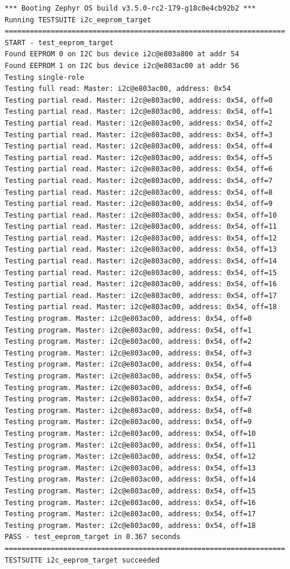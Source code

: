 \documentclass[11pt,a4paper,oneside]{article}
\begin{document}
\begin{lstlisting}
*** Booting Zephyr OS build v3.5.0-rc2-179-g18c0e4cb92b2 ***
Running TESTSUITE i2c_eeprom_target
===================================================================
START - test_eeprom_target
Found EEPROM 0 on I2C bus device i2c@e803a800 at addr 54
Found EEPROM 1 on I2C bus device i2c@e803ac00 at addr 56
Testing single-role
Testing full read: Master: i2c@e803ac00, address: 0x54
Testing partial read. Master: i2c@e803ac00, address: 0x54, off=0
Testing partial read. Master: i2c@e803ac00, address: 0x54, off=1
Testing partial read. Master: i2c@e803ac00, address: 0x54, off=2
Testing partial read. Master: i2c@e803ac00, address: 0x54, off=3
Testing partial read. Master: i2c@e803ac00, address: 0x54, off=4
Testing partial read. Master: i2c@e803ac00, address: 0x54, off=5
Testing partial read. Master: i2c@e803ac00, address: 0x54, off=6
Testing partial read. Master: i2c@e803ac00, address: 0x54, off=7
Testing partial read. Master: i2c@e803ac00, address: 0x54, off=8
Testing partial read. Master: i2c@e803ac00, address: 0x54, off=9
Testing partial read. Master: i2c@e803ac00, address: 0x54, off=10
Testing partial read. Master: i2c@e803ac00, address: 0x54, off=11
Testing partial read. Master: i2c@e803ac00, address: 0x54, off=12
Testing partial read. Master: i2c@e803ac00, address: 0x54, off=13
Testing partial read. Master: i2c@e803ac00, address: 0x54, off=14
Testing partial read. Master: i2c@e803ac00, address: 0x54, off=15
Testing partial read. Master: i2c@e803ac00, address: 0x54, off=16
Testing partial read. Master: i2c@e803ac00, address: 0x54, off=17
Testing partial read. Master: i2c@e803ac00, address: 0x54, off=18
Testing program. Master: i2c@e803ac00, address: 0x54, off=0
Testing program. Master: i2c@e803ac00, address: 0x54, off=1
Testing program. Master: i2c@e803ac00, address: 0x54, off=2
Testing program. Master: i2c@e803ac00, address: 0x54, off=3
Testing program. Master: i2c@e803ac00, address: 0x54, off=4
Testing program. Master: i2c@e803ac00, address: 0x54, off=5
Testing program. Master: i2c@e803ac00, address: 0x54, off=6
Testing program. Master: i2c@e803ac00, address: 0x54, off=7
Testing program. Master: i2c@e803ac00, address: 0x54, off=8
Testing program. Master: i2c@e803ac00, address: 0x54, off=9
Testing program. Master: i2c@e803ac00, address: 0x54, off=10
Testing program. Master: i2c@e803ac00, address: 0x54, off=11
Testing program. Master: i2c@e803ac00, address: 0x54, off=12
Testing program. Master: i2c@e803ac00, address: 0x54, off=13
Testing program. Master: i2c@e803ac00, address: 0x54, off=14
Testing program. Master: i2c@e803ac00, address: 0x54, off=15
Testing program. Master: i2c@e803ac00, address: 0x54, off=16
Testing program. Master: i2c@e803ac00, address: 0x54, off=17
Testing program. Master: i2c@e803ac00, address: 0x54, off=18
PASS - test_eeprom_target in 0.367 seconds
===================================================================
TESTSUITE i2c_eeprom_target succeeded


\end{lstlisting}
\end{document}
